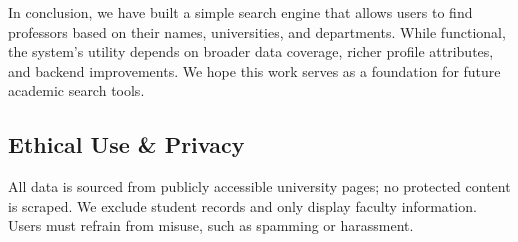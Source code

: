 In conclusion, we have built a simple search engine that allows users to find professors based on their names, universities, and departments. While functional, the system's utility depends on broader data coverage, richer profile attributes, and backend improvements. We hope this work serves as a foundation for future academic search tools.

\subsection{Ethical Use \& Privacy}
All data is sourced from publicly accessible university pages; no protected content is scraped. We exclude student records and only display faculty information. Users must refrain from misuse, such as spamming or harassment.
